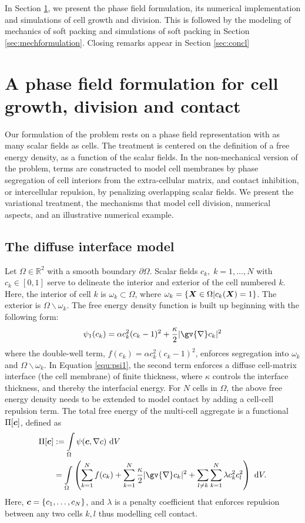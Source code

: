 \documentclass{article}
\newcommand{\grad}[1]{\gv{\nabla} #1}
\def\bX{\mbox{\boldmath$ X$}}
\def\bc{\mbox{\boldmath$ c$}}
\begin{document}
In Section \ref{sec:nonmechformulation}, we present the phase field formulation, its numerical implementation and simulations of cell growth and division. This is followed by the modeling of mechanics of soft packing and simulations of soft packing in Section \ref{sec:mechformulation}. Closing remarks appear in Section \ref{sec:concl}

\section{A phase field formulation for cell growth, division and contact}
\label{sec:nonmechformulation}
Our formulation of the problem rests on a phase field representation with as many scalar fields as cells. The treatment is centered on the definition of a free energy density, as a function of the scalar fields. In the non-mechanical version of the problem, terms are constructed to model cell membranes by phase segregation of cell interiors from the extra-cellular matrix, and contact inhibition, or intercellular repulsion, by penalizing overlapping scalar fields. We present the variational treatment, the mechanisms that model cell division, numerical aspects, and an illustrative numerical example.

\subsection{The diffuse interface model}
Let $\Omega\in \mathbb{R}^2$ with a smooth boundary $\partial \Omega$. Scalar fields $c_k, \;k = 1,\dots,N$ with $c_k \in [0,1]$ serve to delineate the interior and exterior of the cell numbered $k$. Here, the interior of cell $k$ is $\omega_k \subset \Omega$, where $\omega_k = \{ \bX \in \Omega\vert c_k(\bX) =1\}$. The exterior is $\Omega\backslash\omega_k$. The free energy density function is built up beginning with the following form: 
\begin{equation}
\psi_1(c_k) = \alpha c_k^2(c_k-1)^2 + \frac{\kappa}{2}\vert\grad c_k\vert^2
\label{equ:psi1}
\end{equation}
where the double-well term, $f(c_k) = \alpha c_k^2(c_k-1)^2$, enforces segregation into $\omega_k$ and $\Omega\backslash\omega_k$. In Equation \eqref{equ:psi1}, the second term enforces a diffuse cell-matrix interface (the cell membrane) of finite thickness, where $\kappa$ controls the interface thickness, and thereby the interfacial energy. For $N$ cells in $\Omega$, the above free energy density needs to be extended to model contact by adding a cell-cell repulsion term. The total free energy of the multi-cell aggregate is a functional $\Pi[\bc]$, defined as
\begin{align}
\Pi[\bc] &:= \int\limits_\Omega \psi(\bc,\nabla c) ~\text{d}V\nonumber\\
&=\int\limits_\Omega \left(\sum_{k=1}^{N} f(c_k) + \sum_{k=1}^{N} \frac{\kappa}{2}\vert\grad c_k\vert^2 + \sum_{l\ne k}\sum_{k=1}^{N}\lambda c_k^2 c_l^2 \right) ~\text{d}V.
\label{equ:energy}
\end{align}
Here, $\bc = \{c_1,\dots,c_N\}$, and $\lambda$ is a penalty coefficient that enforces repulsion between any two cells $k,l$ thus modelling cell contact.
\end{document}
